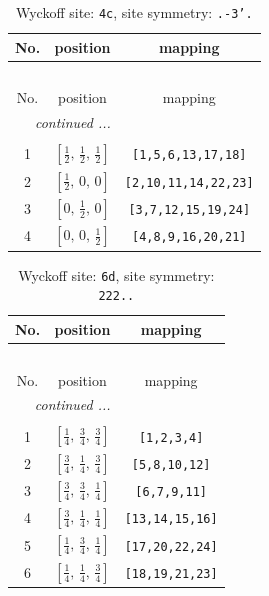 \documentclass[fleqn,8pt]{jsarticle}
\begin{document}
\renewcommand{\arraystretch}{1.2}
\begin{longtable}{ccc}
\caption{Wyckoff site: {\tt 4c}, site symmetry: {\tt .-3'.}}
 \\
 \hline \hline
No. & position & mapping \\ \hline \endfirsthead

\multicolumn{2}{l}{\tablename\ \thetable{}} \\
 \hline \hline
No. & position & mapping \\ \hline \endhead

 \hline \hline
\multicolumn{2}{r}{\footnotesize\it continued ...} \\ \endfoot

 \hline \hline
\multicolumn{2}{r}{} \\ \endlastfoot

1 & $\left[ \frac{1}{2},\, \frac{1}{2},\, \frac{1}{2} \right]$ & {\tt [1,5,6,13,17,18]} \\ \hline
2 & $\left[ \frac{1}{2},\, 0,\, 0 \right]$ & {\tt [2,10,11,14,22,23]} \\ \hline
3 & $\left[ 0,\, \frac{1}{2},\, 0 \right]$ & {\tt [3,7,12,15,19,24]} \\ \hline
4 & $\left[ 0,\, 0,\, \frac{1}{2} \right]$ & {\tt [4,8,9,16,20,21]} \\
\end{longtable}
\renewcommand{\arraystretch}{1.2}
\begin{longtable}{ccc}
\caption{Wyckoff site: {\tt 6d}, site symmetry: {\tt 222..}}
 \\
 \hline \hline
No. & position & mapping \\ \hline \endfirsthead

\multicolumn{2}{l}{\tablename\ \thetable{}} \\
 \hline \hline
No. & position & mapping \\ \hline \endhead

 \hline \hline
\multicolumn{2}{r}{\footnotesize\it continued ...} \\ \endfoot

 \hline \hline
\multicolumn{2}{r}{} \\ \endlastfoot

1 & $\left[ \frac{1}{4},\, \frac{3}{4},\, \frac{3}{4} \right]$ & {\tt [1,2,3,4]} \\ \hline
2 & $\left[ \frac{3}{4},\, \frac{1}{4},\, \frac{3}{4} \right]$ & {\tt [5,8,10,12]} \\ \hline
3 & $\left[ \frac{3}{4},\, \frac{3}{4},\, \frac{1}{4} \right]$ & {\tt [6,7,9,11]} \\ \hline
4 & $\left[ \frac{3}{4},\, \frac{1}{4},\, \frac{1}{4} \right]$ & {\tt [13,14,15,16]} \\ \hline
5 & $\left[ \frac{1}{4},\, \frac{3}{4},\, \frac{1}{4} \right]$ & {\tt [17,20,22,24]} \\ \hline
6 & $\left[ \frac{1}{4},\, \frac{1}{4},\, \frac{3}{4} \right]$ & {\tt [18,19,21,23]} \\
\end{longtable}
\end{document}
